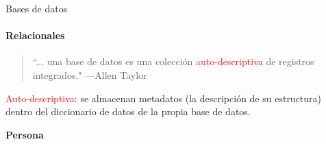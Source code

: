 \begin{frame}{Bases de datos}
    \framesubtitle{Relacionales}

    \begin{overlayarea}{\linewidth}{\textheight}
        \begin{onlyenv}
            \begin{block}{}
            \begin{quote}
                ``... una base de datos es una colecci\'on \textcolor{red}{auto-descriptiva} de registros integrados."
                \hspace{1em plus 1fill}---Allen Taylor
            \end{quote}
    
            \textcolor{red}{Auto-descriptiva}: se almacenan metadatos (la descripci\'on de su estructura) dentro
            del diccionario de datos de la propia base de datos.
        \end{block}
      \end{onlyenv}
      
          \vspace{5mm}
          \large \textbf{Persona}
          \vspace{2mm}
    \end{overlayarea}
\end{frame}



